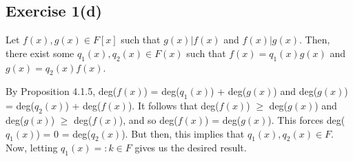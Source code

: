 \subsection*{Exercise 1(d)}
Let $f(x), g(x) \in F[x]$ such that $g(x) \vert f(x)$ and $f(x) \vert g(x)$. Then, there exist some $q_1(x), q_2(x) \in F(x)$ such that $f(x) = q_1(x)g(x)$ and $g(x) = q_2(x)f(x)$. 

By Proposition 4.1.5, deg($f(x)$) = deg($q_1(x)$) + deg($g(x)$) and deg($g(x)$) = deg($q_2(x)$) + deg($f(x)$). It follows that deg($f(x)$) $\ge$ deg($g(x)$) and deg($g(x)$) $\ge$ deg($f(x)$), and so deg($f(x)$) = deg($g(x)$). This forces deg($q_1(x)$) = 0 = deg($q_2(x)$). But then, this implies that $q_1(x), q_2(x) \in F$. Now, letting $q_1(x) =: k \in F$ gives us the desired result.